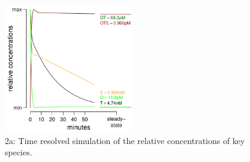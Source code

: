 \documentclass{article}
\newenvironment{Ncenter}{%
  \setlength\topsep{-10pt}
  \setlength\parskip{-100pt}
  \begin{center}
}{%
  \end{center}
}
\begin{document}
\begin{figure}[!h]
\begin{Ncenter}
\includegraphics[width=0.5\textwidth]{Vignette2-Figa}
\end{Ncenter}
\caption{2a: Time resolved simulation of the relative concentrations of key species.}
\end{figure}

\end{document}
